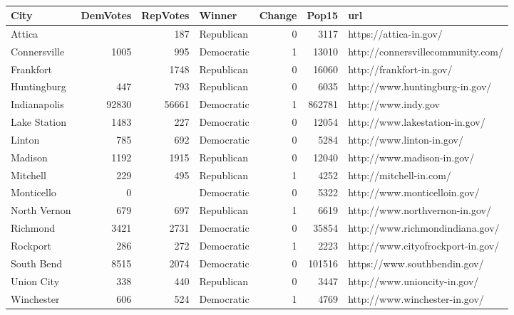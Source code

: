 \documentclass[11pt]{article}
\begin{document}
\begin{table}[ht]
	\centering
	\begin{tabular}{lrrlrrl}
		\hline
		City & DemVotes & RepVotes & Winner & Change & Pop15 & url \\ 
		\hline
		Attica &  & 187 & Republican & 0 & 3117 & https://attica-in.gov/ \\ 
		Connersville & 1005 & 995 & Democratic & 1 & 13010 & http://connersvillecommunity.com/ \\ 
		Frankfort &  & 1748 & Republican & 0 & 16060 & http://frankfort-in.gov/ \\ 
		Huntingburg & 447 & 793 & Republican & 0 & 6035 & http://www.huntingburg-in.gov/ \\ 
		Indianapolis & 92830 & 56661 & Democratic & 1 & 862781 & http://www.indy.gov \\ 
		Lake Station & 1483 & 227 & Democratic & 0 & 12054 & http://www.lakestation-in.gov/ \\ 
		Linton & 785 & 692 & Democratic & 0 & 5284 & http://www.linton-in.gov/ \\ 
		Madison & 1192 & 1915 & Republican & 0 & 12040 & http://www.madison-in.gov/ \\ 
		Mitchell & 229 & 495 & Republican & 1 & 4252 & http://mitchell-in.com/ \\ 
		Monticello & 0 &  & Democratic & 0 & 5322 & http://www.monticelloin.gov/ \\ 
		North Vernon & 679 & 697 & Republican & 1 & 6619 & http://www.northvernon-in.gov/ \\ 
		Richmond & 3421 & 2731 & Democratic & 0 & 35854 & http://www.richmondindiana.gov/ \\ 
		Rockport & 286 & 272 & Democratic & 1 & 2223 & http://www.cityofrockport-in.gov/ \\ 
		South Bend & 8515 & 2074 & Democratic & 0 & 101516 & https://www.southbendin.gov/ \\ 
		Union City & 338 & 440 & Republican & 0 & 3447 & http://www.unioncity-in.gov/ \\ 
		Winchester & 606 & 524 & Democratic & 1 & 4769 & http://www.winchester-in.gov/ \\ 
		\hline
	\end{tabular}
	\caption{} 
\end{table}
\end{document}
